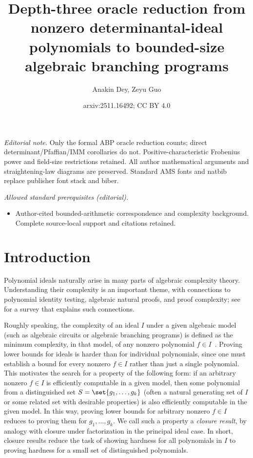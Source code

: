 \documentclass[10pt,a4paper]{amsart}
\title{Depth-three oracle reduction from nonzero determinantal-ideal polynomials to bounded-size algebraic branching programs}
\author{Anakin Dey, Zeyu Guo}
\date{arxiv:2511.16492; CC BY 4.0}
\begin{document}
\maketitle
\noindent\textit{Editorial note.} Only the formal ABP oracle reduction counts; direct determinant/Pfaffian/IMM corollaries do not. Positive-characteristic Frobenius power and field-size restrictions retained. All author mathematical arguments and straightening-law diagrams are preserved. Standard AMS fonts and natbib replace publisher font stack and biber.\par\medskip
\noindent\textit{Allowed standard prerequisites (editorial).}\begin{itemize}
\item Author-cited bounded-arithmetic correspondence and complexity background. Complete source-local support and citations retained.
\end{itemize}\medskip
\section{Introduction}\label{sec:intro}

Polynomial ideals naturally arise in many parts of algebraic complexity theory.
Understanding their complexity is an important theme, with connections to polynomial identity testing, algebraic natural proofs, and proof complexity; see~\cite{Grochow20} for a survey that explains such connections.

Roughly speaking, the complexity of an ideal $I$ under a given algebraic model (such as algebraic circuits or algebraic branching programs) is defined as the minimum complexity, in that model, of any nonzero polynomial $f \in I$~\cite{Grochow20}.
Proving lower bounds for ideals is harder than for individual polynomials, since one must establish a bound for every nonzero $f \in I$ rather than just a single polynomial.
This motivates the search for a property of the following form: if an arbitrary nonzero $f \in I$ is efficiently computable in a given model, then some polynomial from a distinguished set $S = \set{g_1, \dots, g_k}$ (often a natural generating set of $I$ or some related set with desirable properties) is also efficiently computable in the given model.
In this way, proving lower bounds for arbitrary nonzero $f \in I$ reduces to proving them for $g_1, \dots, g_k$.
We call such a property a \emph{closure result}, by analogy with closure under factorization in the principal ideal case.
In short, closure results reduce the task of showing hardness for all polynomials in $I$ to proving hardness for a small set of distinguished polynomials.
\end{document}
